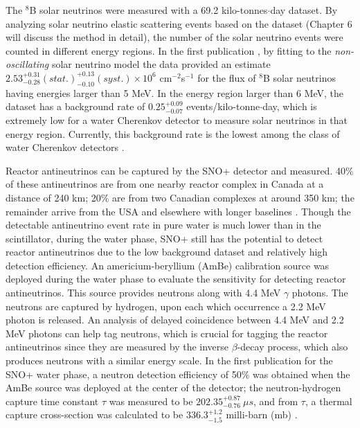 The $^8$B solar neutrinos were measured with a 69.2 kilo-tonnes$\cdot$day dataset. By analyzing solar neutrino elastic scattering events based on the dataset (Chapter 6 will discuss the method in detail), the number of the solar neutrino events were counted in different energy regions. In the first publication \cite{anderson2019measurement}, by fitting to the {\em non-oscillating} solar neutrino model the data provided an estimate $2.53^{+0.31}_{-0.28}(stat.)^{+0.13}_{-0.10}(syst.)\times 10^6$ cm$^{-2}$s$^{-1}$ for the flux of $^8$B solar neutrinos having energies larger than 5 MeV. In the energy region larger than 6 MeV, the dataset has a background rate of $0.25^{+0.09}_{-0.07}$ events/kilo-tonne$\cdot$day\cite{anderson2019measurement}, which is extremely low for a water Cherenkov detector to measure solar neutrinos in that energy region. Currently, this background rate is the lowest among the class of water Cherenkov detectors \cite{anderson2019measurement}. 

Reactor antineutrinos can be captured by the SNO+ detector and measured. 40\% of these antineutrinos are from one nearby reactor complex in Canada at a distance of 240 km; 20\% are from two Canadian complexes at around 350 km; the remainder arrive from the USA and elsewhere with longer baselines \cite{whitepaper}. Though the detectable antineutrino event rate in pure water is much lower than in the scintillator, during the water phase, SNO+ still has the potential to detect reactor antineutrinos due to the low background dataset and relatively high detection efficiency. An americium-beryllium (AmBe) calibration source was deployed during the water phase to evaluate the sensitivity for detecting reactor antineutrinos. This source provides neutrons along with 4.4 MeV $\gamma$ photons. The neutrons are captured by hydrogen, upon each which occurrence a 2.2 MeV photon is released. An analysis of delayed coincidence between 4.4 MeV and 2.2 MeV photons can help tag neutrons, which is crucial for tagging the reactor antineutrinos since they are measured by the inverse $\beta$-decay process, which also produces neutrons with a similar energy scale. In the first publication for the SNO+ water phase, a neutron detection efficiency of 50\% was obtained when the AmBe source was deployed at the center of the detector; the neutron-hydrogen capture time constant $\tau$ was measured to be $202.35_{-0.76}^{+0.87}~\mu s$, and from $\tau$, a thermal capture cross-section was calculated to be $336.3^{+1.2}_{-1.5}$ milli-barn (mb) \cite{anderson2020measurement}.

